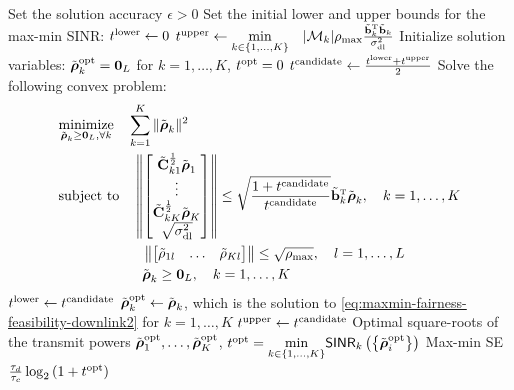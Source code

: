 \begin{algorithm}
	\caption{Bisection search algorithm for solving the max-min fairness problem in \eqref{eq:maxmin-fairness-problem-downlink-t}.} \label{alg:bisection-downlink-case}
	\begin{algorithmic}[1]
		 Set the solution accuracy $\epsilon>0$
		\State Set the initial lower and upper bounds for the max-min SINR:
		\State $t^{\rm lower}\gets0$
		\State $t^{\rm upper}\gets \underset{k\in \{1,\ldots,K\}}{\min}\quad |\mathcal{M}_k|\rhomax\frac{\tilde{\vect{b}}_k^{\Ttran}\tilde{\vect{b}}_k}{\sigmaDL}$
		\State Initialize solution variables: $\tilde{\boldsymbol{\rho}}_k^{\rm opt}=\mathbf{0}_L$ for $k=1,\ldots,K$, $t^{\rm opt}=0$
		\State $t^{\rm candidate}\gets \frac{t^{\rm lower}+t^{\rm upper}}{2}$
		\State Solve the following convex problem:
\begin{align} \label{eq:maxmin-fairness-feasibility-downlink2}
&\underset{\tilde{\boldsymbol{\rho}}_k\geq \vect{0}_L, \forall k}{\textrm{minimize}} \quad \sum_{k=1}^{K} \| \tilde{\boldsymbol{\rho}}_k\|^2  \\
&\textrm{subject to} \quad   \left \Vert \begin{bmatrix}   \tilde{\vect{C}}_{k1}^{\frac12}\tilde{\boldsymbol{\rho}}_1 \\ \vdots \\ \tilde{\vect{C}}_{kK}^{\frac12}\tilde{\boldsymbol{\rho}}_K \\ \sqrt{\sigmaDL} \end{bmatrix} \right \Vert \leq \sqrt{\frac{1+ t^{\rm candidate}}{ t^{\rm candidate}}}\tilde{\vect{b}}_k^{\Ttran}\tilde{\boldsymbol{\rho}}_k, \quad k=1,\ldots,K \nonumber \\
&\hspace{21mm} \left\| \begin{bmatrix}  \tilde{\rho}_{1l} & \ldots &  \tilde{\rho}_{Kl} \end{bmatrix}  \right\| \leq \sqrt{\rhomax}, \quad l=1,\ldots,L \nonumber \\
&\hspace{21mm} \tilde{\boldsymbol{\rho}}_k \geq \vect{0}_L, \quad k=1,\ldots,K \nonumber
\end{align}
		\State $t^{\rm lower}\gets t^{\rm candidate}$
		\State $\tilde{\boldsymbol{\rho}}_k^{\rm opt} \gets \tilde{\boldsymbol{\rho}}_k$, which is the solution to \eqref{eq:maxmin-fairness-feasibility-downlink2} for $k=1,\ldots,K$
		\Else
		\State  $t^{\rm upper}\gets t^{\rm candidate}$
		\EndIf
		\EndWhile
		 Optimal square-roots of the transmit powers $\tilde{\boldsymbol{\rho}}_1^{\rm opt},\ldots,\tilde{\boldsymbol{\rho}}_K^{\rm opt}$, $t^{\rm opt}=\underset{k\in \{1,\ldots,K\}}{\min} \mathsf{SINR}_{k}\left(\left\{\tilde{\boldsymbol{\rho}}_i^{\rm opt}\right\}\right)$
		\State Max-min SE $\frac{\tau_d}{\tau_c}\log_2\left(1+ t^{\rm opt}\right)$
	\end{algorithmic}
\end{algorithm}


